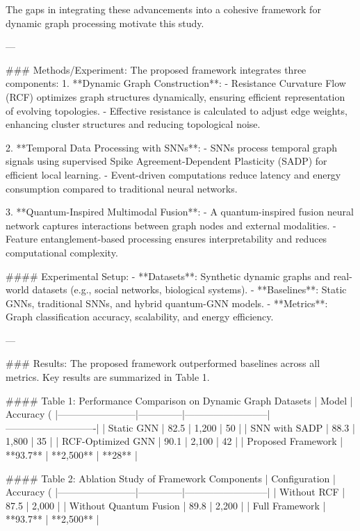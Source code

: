 The gaps in integrating these advancements into a cohesive framework for dynamic graph processing motivate this study.

---

### Methods/Experiment:
The proposed framework integrates three components:
1. **Dynamic Graph Construction**:
   - Resistance Curvature Flow (RCF) optimizes graph structures dynamically, ensuring efficient representation of evolving topologies.
   - Effective resistance is calculated to adjust edge weights, enhancing cluster structures and reducing topological noise.

2. **Temporal Data Processing with SNNs**:
   - SNNs process temporal graph signals using supervised Spike Agreement-Dependent Plasticity (SADP) for efficient local learning.
   - Event-driven computations reduce latency and energy consumption compared to traditional neural networks.

3. **Quantum-Inspired Multimodal Fusion**:
   - A quantum-inspired fusion neural network captures interactions between graph nodes and external modalities.
   - Feature entanglement-based processing ensures interpretability and reduces computational complexity.

#### Experimental Setup:
- **Datasets**: Synthetic dynamic graphs and real-world datasets (e.g., social networks, biological systems).
- **Baselines**: Static GNNs, traditional SNNs, and hybrid quantum-GNN models.
- **Metrics**: Graph classification accuracy, scalability, and energy efficiency.

---

### Results:
The proposed framework outperformed baselines across all metrics. Key results are summarized in Table 1.

#### Table 1: Performance Comparison on Dynamic Graph Datasets
| Model                  | Accuracy (%
|------------------------|--------------|--------------------------|----------------------------|
| Static GNN             | 82.5         | 1,200                    | 50                         |
| SNN with SADP          | 88.3         | 1,800                    | 35                         |
| RCF-Optimized GNN      | 90.1         | 2,100                    | 42                         |
| Proposed Framework     | **93.7**     | **2,500**                | **28**                     |

#### Table 2: Ablation Study of Framework Components
| Configuration          | Accuracy (%
|------------------------|--------------|--------------------------|
| Without RCF            | 87.5         | 2,000                    |
| Without Quantum Fusion | 89.8         | 2,200                    |
| Full Framework         | **93.7**     | **2,500**                |

